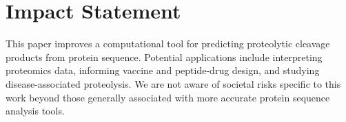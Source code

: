 \documentclass{article}
\begin{document}
\FloatBarrier


\section*{Impact Statement}
This paper improves a computational tool for predicting proteolytic cleavage products from protein sequence. Potential applications include interpreting proteomics data, informing vaccine and peptide-drug design, and studying disease-associated proteolysis. We are not aware of societal risks specific to this work beyond those generally associated with more accurate protein sequence analysis tools.
\end{document}
